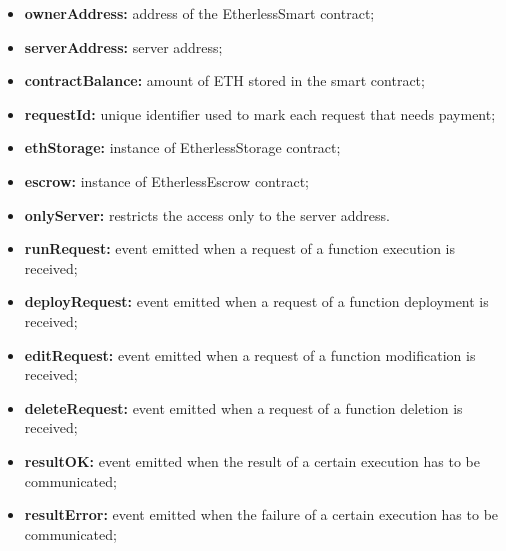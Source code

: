 	\begin{itemize}
		\item \textbf{ownerAddress:} address of the EtherlessSmart contract;
		\item \textbf{serverAddress:} server address;
		\item \textbf{contractBalance:} amount of ETH stored in the smart contract;
		\item \textbf{requestId:} unique identifier used to mark each request that needs payment;
		\item \textbf{ethStorage:} instance of EtherlessStorage contract;
		\item \textbf{escrow:} instance of EtherlessEscrow contract;
	\end{itemize}
	\begin{itemize}
		\item \textbf{onlyServer:} restricts the access only to the server address.
	\end{itemize}
	\begin{itemize}
		\item \textbf{runRequest:} event emitted when a request of a function execution is received;
		\item \textbf{deployRequest:} event emitted when a request of a function deployment is received;
		\item \textbf{editRequest:} event emitted when a request of a function modification is received;
		\item \textbf{deleteRequest:} event emitted when a request of a function deletion is received;
		\item \textbf{resultOK:} event emitted when the result of a certain execution has to be communicated;
		\item \textbf{resultError:} event emitted when the failure of a certain execution has to be communicated;
	\end{itemize}
